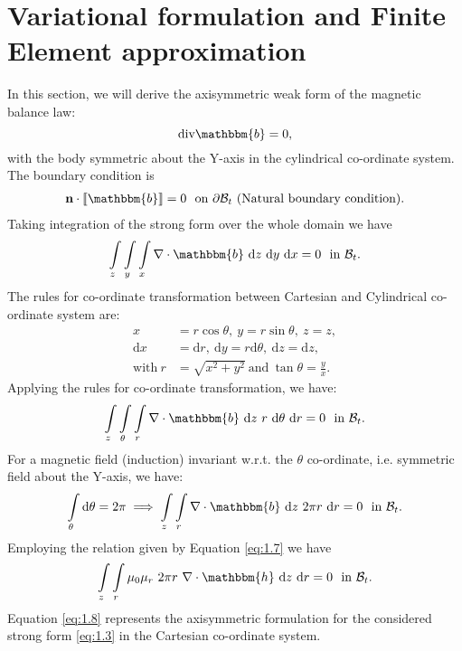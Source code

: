 \section{Variational formulation and Finite Element approximation}
In this section, we will derive the axisymmetric weak form of the magnetic balance law:
\begin{equation}
 \text{div}\mathbbm{b} = 0,
 \end{equation} 
with the body symmetric about the Y-axis in the cylindrical co-ordinate system. The boundary condition is
\begin{align}
\mathbf{n} \cdot \llbracket \mathbbm{b} \rrbracket = 0 \ \ \text{on} \ \partial\mathcal{B}_t \ (\text{Natural boundary condition}).
\label{eq:1.10}
\end{align}
Taking integration of the strong form over the whole domain we have 
\begin{equation}
\int\limits_{z} \int\limits_{y} \int\limits_{x} \nabla \cdot \mathbbm{b} \ \mathrm{d}z \ \mathrm{d}y \ \mathrm{d}x = 0 \ \ \text{in} \ \mathcal{B}_t. 
\end{equation}
The rules for co-ordinate transformation between Cartesian and Cylindrical co-ordinate system are:
\begin{align}
x &= r \cos \theta, \ y = r \sin \theta, \ z = z, \nonumber\\
\mathrm{d}x &= \mathrm{d}r, \ \mathrm{d}y = r \mathrm{d}\theta, \ \mathrm{d}z = \mathrm{d}z, \nonumber\\
\text{with} \ r &= \sqrt{x^2 + y^2} \ \text{and} \ \tan \theta = \frac{y}{x}.
\end{align}
Applying the rules for co-ordinate transformation, we have:
\begin{equation}
\int\limits_{z} \int\limits_{\theta} \int\limits_{r} \nabla \cdot \mathbbm{b} \ \mathrm{d}z \ r \ \mathrm{d}\theta \ \mathrm{d}r = 0 \ \ \text{in} \ \mathcal{B}_t.
\end{equation}
For a magnetic field (induction) invariant w.r.t. the $\theta$ co-ordinate, i.e. symmetric field about the Y-axis, we have:
\begin{align}
\int\limits_{\theta} \mathrm{d}\theta = 2 \pi \implies \int\limits_{z} \int\limits_{r} \nabla \cdot \mathbbm{b} \ \mathrm{d}z \ 2 \pi r \ \mathrm{d}r = 0 \ \ \text{in} \ \mathcal{B}_t.
\label{eq:1.6}
\end{align}
Employing the relation given by Equation \eqref{eq:1.7} we have
\begin{equation}
\int\limits_{z} \int\limits_{r} \mu_0 \mu_r \ 2 \pi r \ \nabla \cdot \mathbbm{h} \ \mathrm{d}z \ \mathrm{d}r = 0 \ \ \text{in} \ \mathcal{B}_t.
\label{eq:1.8}
\end{equation}
Equation \eqref{eq:1.8} represents the axisymmetric formulation for the considered strong form \eqref{eq:1.3} in the Cartesian co-ordinate system. \par 

